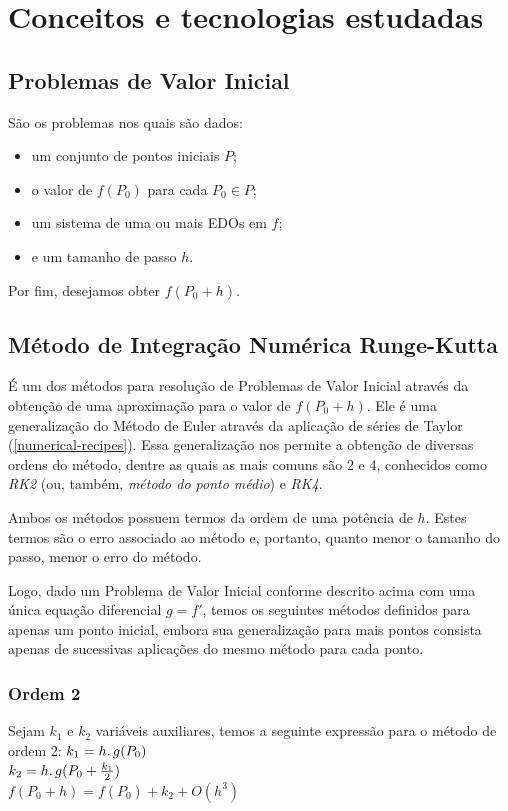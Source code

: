 \chapter{Conceitos e tecnologias estudadas}

\section{Problemas de Valor Inicial}
São os problemas nos quais são dados:
\begin{itemize}
  \item um conjunto de pontos iniciais $P$;
  \item o valor de $f(P_{0})$ para cada $P_{0} \in P$;
  \item um sistema de uma ou mais EDOs em $f$;
  \item e um tamanho de passo $h$.
\end{itemize}

Por fim, desejamos obter $f(P_{0} + h)$.

\section{Método de Integração Numérica Runge-Kutta}\label{rungekutta}
É um dos métodos para resolução de Problemas de Valor Inicial através da obtenção de uma aproximação para o valor de $f(P_{0} + h)$. Ele é uma generalização do Método de Euler através da aplicação de séries de Taylor (\ref{numerical-recipes}). Essa generalização nos permite a obtenção de diversas ordens do método, dentre as quais as mais comuns são 2 e 4, conhecidos como \textit{RK2} (ou, também, \textit{método do ponto médio}) e \textit{RK4}.

Ambos os métodos possuem termos da ordem de uma potência de $h$. Estes termos são o erro associado ao método e, portanto, quanto menor o tamanho do passo, menor o erro do método.

Logo, dado um Problema de Valor Inicial conforme descrito acima com uma única equação diferencial $g = f'$, temos os seguintes métodos definidos para apenas um ponto inicial, embora sua generalização para mais pontos consista apenas de sucessivas aplicações do mesmo método para cada ponto.

  \newpage
  \subsection{Ordem 2}
  Sejam $k_{1}$ e $k_{2}$ variáveis auxiliares, temos a seguinte expressão para o método de ordem 2:
  \newline
  \newline
  $k_{1} = h\ldotp g(P_{0})$\\
  $k_{2} = h\ldotp g(P_{0} + \frac{k_{1}}{2})$\\
  $f(P_{0} + h) = f(P_{0}) + k_{2} + O(h^{3})$
  
